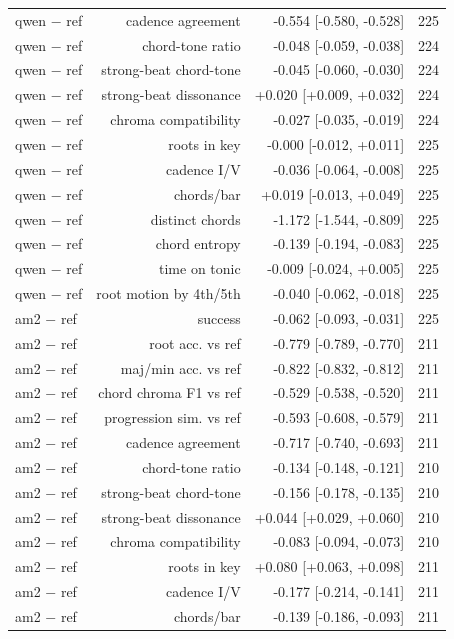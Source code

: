 \begin{table}[t]
\begin{tabular}{lrrr}
qwen $-$ ref & cadence agreement & -0.554 [-0.580, -0.528] & 225 \\
qwen $-$ ref & chord-tone ratio & -0.048 [-0.059, -0.038] & 224 \\
qwen $-$ ref & strong-beat chord-tone & -0.045 [-0.060, -0.030] & 224 \\
qwen $-$ ref & strong-beat dissonance & +0.020 [+0.009, +0.032] & 224 \\
qwen $-$ ref & chroma compatibility & -0.027 [-0.035, -0.019] & 224 \\
qwen $-$ ref & roots in key & -0.000 [-0.012, +0.011] & 225 \\
qwen $-$ ref & cadence I/V & -0.036 [-0.064, -0.008] & 225 \\
qwen $-$ ref & chords/bar & +0.019 [-0.013, +0.049] & 225 \\
qwen $-$ ref & distinct chords & -1.172 [-1.544, -0.809] & 225 \\
qwen $-$ ref & chord entropy & -0.139 [-0.194, -0.083] & 225 \\
qwen $-$ ref & time on tonic & -0.009 [-0.024, +0.005] & 225 \\
qwen $-$ ref & root motion by 4th/5th & -0.040 [-0.062, -0.018] & 225 \\
am2 $-$ ref & success & -0.062 [-0.093, -0.031] & 225 \\
am2 $-$ ref & root acc. vs ref & -0.779 [-0.789, -0.770] & 211 \\
am2 $-$ ref & maj/min acc. vs ref & -0.822 [-0.832, -0.812] & 211 \\
am2 $-$ ref & chord chroma F1 vs ref & -0.529 [-0.538, -0.520] & 211 \\
am2 $-$ ref & progression sim. vs ref & -0.593 [-0.608, -0.579] & 211 \\
am2 $-$ ref & cadence agreement & -0.717 [-0.740, -0.693] & 211 \\
am2 $-$ ref & chord-tone ratio & -0.134 [-0.148, -0.121] & 210 \\
am2 $-$ ref & strong-beat chord-tone & -0.156 [-0.178, -0.135] & 210 \\
am2 $-$ ref & strong-beat dissonance & +0.044 [+0.029, +0.060] & 210 \\
am2 $-$ ref & chroma compatibility & -0.083 [-0.094, -0.073] & 210 \\
am2 $-$ ref & roots in key & +0.080 [+0.063, +0.098] & 211 \\
am2 $-$ ref & cadence I/V & -0.177 [-0.214, -0.141] & 211 \\
am2 $-$ ref & chords/bar & -0.139 [-0.186, -0.093] & 211 \\

\end{tabular}
\end{table}
